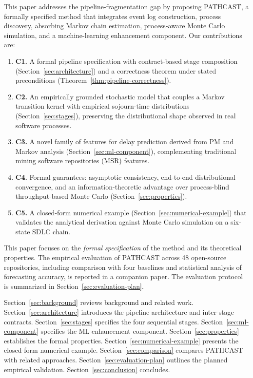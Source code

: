 This paper addresses the pipeline-fragmentation gap by proposing
\textsc{PATHCAST}, a formally specified method that integrates event
log construction, process discovery, absorbing Markov chain estimation,
process-aware Monte Carlo simulation, and a machine-learning enhancement
component. Our contributions are:
\begin{enumerate}
    \item \textbf{C1.} A formal pipeline specification with contract-based
    stage composition (Section~\ref{sec:architecture}) and a correctness
    theorem under stated preconditions
    (Theorem~\ref{thm:pipeline-correctness}).
    \item \textbf{C2.} An empirically grounded stochastic model that
    couples a Markov transition kernel with empirical sojourn-time
    distributions (Section~\ref{sec:stages}), preserving the
    distributional shape observed in real software processes.
    \item \textbf{C3.} A novel family of features for delay prediction
    derived from PM and Markov analysis
    (Section~\ref{sec:ml-component}), complementing traditional mining
    software repositories (MSR) features.
    \item \textbf{C4.} Formal guarantees: asymptotic consistency,
    end-to-end distributional convergence, and an information-theoretic
    advantage over process-blind throughput-based Monte Carlo
    (Section~\ref{sec:properties}).
    \item \textbf{C5.} A closed-form numerical example
    (Section~\ref{sec:numerical-example}) that validates the analytical
    derivation against Monte Carlo simulation on a six-state SDLC chain.
\end{enumerate}

This paper focuses on the \emph{formal specification} of the method and
its theoretical properties. The empirical evaluation of \textsc{PATHCAST}
across 48 open-source repositories, including comparison with four
baselines and statistical analysis of forecasting accuracy, is reported
in a companion paper. The evaluation protocol is summarized in
Section~\ref{sec:evaluation-plan}.

Section~\ref{sec:background} reviews background and related work.
Section~\ref{sec:architecture} introduces the pipeline architecture and
inter-stage contracts. Section~\ref{sec:stages} specifies the four
sequential stages. Section~\ref{sec:ml-component} specifies the ML
enhancement component. Section~\ref{sec:properties} establishes the
formal properties. Section~\ref{sec:numerical-example} presents the
closed-form numerical example. Section~\ref{sec:comparison} compares
\textsc{PATHCAST} with related approaches.
Section~\ref{sec:evaluation-plan} outlines the planned empirical
validation. Section~\ref{sec:conclusion} concludes.
